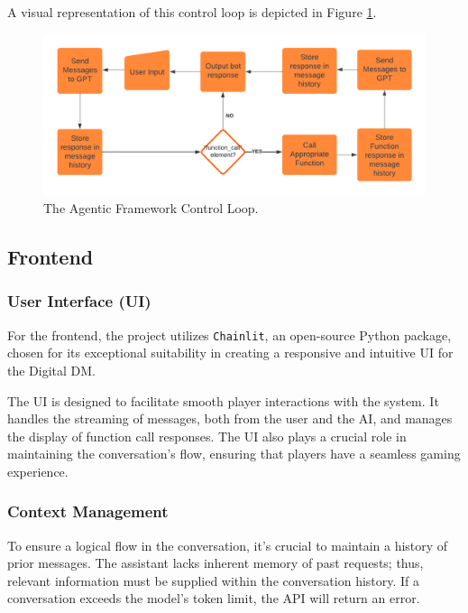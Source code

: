 \documentclass[letterpaper]{article}
\begin{document}
A visual representation of this control loop is depicted in Figure \ref{fig:control_loop}.

\begin{figure}[h]
    \centering
    \includegraphics[width=\linewidth]{control_loop.png}
    \caption{The Agentic Framework Control Loop.}
    \label{fig:control_loop}
\end{figure}

\subsection{Frontend}
\subsubsection{User Interface (UI)}
For the frontend, the project utilizes \texttt{Chainlit}, an open-source Python package, chosen for its exceptional suitability in creating a responsive and intuitive UI for the Digital DM.

The UI is designed to facilitate smooth player interactions with the system. It handles the streaming of messages, both from the user and the AI, and manages the display of function call responses. The UI also plays a crucial role in maintaining the conversation's flow, ensuring that players have a seamless gaming experience.

\subsubsection{Context Management}
To ensure a logical flow in the conversation, it's crucial to maintain a history of prior messages. The assistant lacks inherent memory of past requests; thus, relevant information must be supplied within the conversation history. If a conversation exceeds the model’s token limit, the API will return an error.
\end{document}
